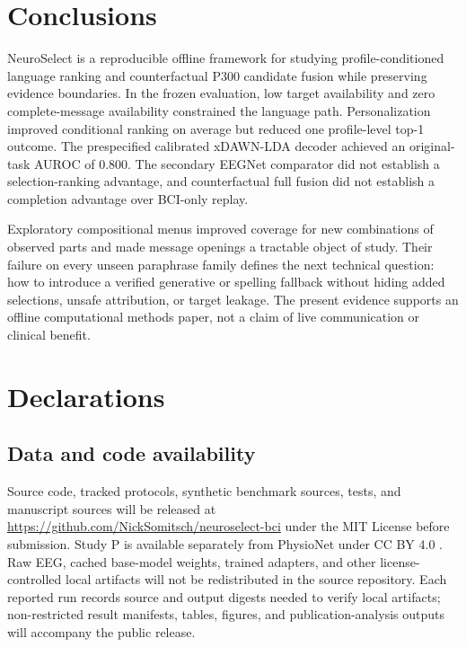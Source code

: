 \documentclass[11pt]{article}
\begin{document}
\section{Conclusions}

NeuroSelect is a reproducible offline framework for studying profile-conditioned language ranking and counterfactual P300 candidate fusion while preserving evidence boundaries. In the frozen evaluation, low target availability and zero complete-message availability constrained the language path. Personalization improved conditional ranking on average but reduced one profile-level top-1 outcome. The prespecified calibrated xDAWN-LDA decoder achieved an original-task AUROC of 0.800. The secondary EEGNet comparator did not establish a selection-ranking advantage, and counterfactual full fusion did not establish a completion advantage over BCI-only replay.


Exploratory compositional menus improved coverage for new combinations of observed parts and made message openings a tractable object of study. Their failure on every unseen paraphrase family defines the next technical question: how to introduce a verified generative or spelling fallback without hiding added selections, unsafe attribution, or target leakage. The present evidence supports an offline computational methods paper, not a claim of live communication or clinical benefit.


\section*{Declarations}


\subsection{Data and code availability}

Source code, tracked protocols, synthetic benchmark sources, tests, and manuscript sources will be released at \url{https://github.com/NickSomitsch/neuroselect-bci} under the MIT License before submission. Study P is available separately from PhysioNet under CC BY 4.0 \cite{mainsah2025}. Raw EEG, cached base-model weights, trained adapters, and other license-controlled local artifacts will not be redistributed in the source repository. Each reported run records source and output digests needed to verify local artifacts; non-restricted result manifests, tables, figures, and publication-analysis outputs will accompany the public release.
\end{document}

